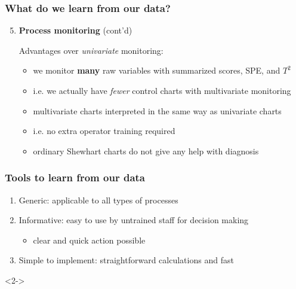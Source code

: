\documentclass[handout, 12pt]{beamer}
\begin{document}
\begin{frame}\frametitle{What do we learn from our data?}

\begin{enumerate}
	\setcounter{enumi}{4}
	\item 	{\bf \color{myGreen}Process monitoring} (cont'd)	

	\vspace{10pt}	
			Advantages over \emph{univariate} monitoring:
		
			\begin{itemize}
				\item 	we monitor \textbf{many} raw variables with summarized scores, SPE, and \( T^2 \)
				\item 	i.e. we actually have \emph{fewer} control charts with multivariate monitoring
				\item 	multivariate charts interpreted in the same way as univariate charts
				\item 	i.e. no extra operator training required
				\item 	ordinary Shewhart charts do not give any help with diagnosis
			\end{itemize}	
\end{enumerate}
\end{frame}

\begin{frame}\frametitle{Tools to learn from our data}

\begin{enumerate}
	\item 	\alert{Generic}: applicable to all types of processes
	\item 	\alert{Informative}: easy to use by untrained staff for decision making
		\begin{itemize}
			\item clear and quick action possible
		\end{itemize}
	\item 	\alert{Simple to implement}: straightforward calculations and fast
\end{enumerate}

\vspace{1cm}

\begin{exampleblock}{}<2->
\end{exampleblock}
\end{frame}

\end{document}
